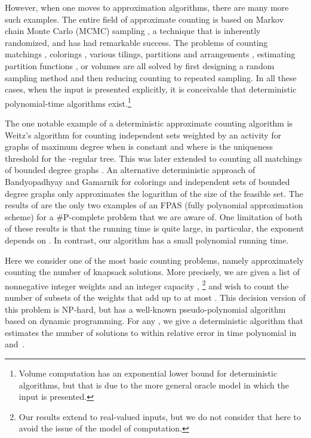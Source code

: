 \documentclass[11pt]{article}
\begin{document}
However, when one moves to approximation algorithms, there are
many more such examples. The entire field of approximate counting
is based on Markov chain Monte Carlo (MCMC) sampling
\cite{JerrumSinclair:survey}, a technique that is inherently
randomized, and has had remarkable success. The problems of
counting matchings
\cite{JerrumSinclair:matchings,JerrumSinclairVigoda}, colorings
\cite{Jerrum:colorings}, various tilings, partitions and
arrangements \cite{LubyRandallSinclair}, estimating partition
functions \cite{JerrumSinclair:Ising,StefankovicVempalaVigoda}, or
volumes \cite{DyerFriezeKannan,LovaszVempala} are all solved by
first designing a random sampling method and then reducing
counting to repeated sampling.
In all these cases, when
the input is presented explicitly, it is conceivable that
deterministic polynomial-time algorithms exist.\footnote{Volume
computation has an exponential lower bound for deterministic
algorithms, but that is due to the more general oracle model in
which the input is presented.}

The one notable example of a deterministic approximate counting
algorithm is Weitz's algorithm \cite{Weitz} for counting independent
sets weighted by an activity  for graphs of maximum degree 
when  is constant and
 where  is
the uniqueness threshold for the -regular tree.
This was later extended to counting all matchings of bounded degree
graphs \cite{BGKNT}.
An alternative deterministic approach of Bandyopadhyay and
Gamarnik \cite{BG} for colorings and independent sets of bounded degree
graphs only approximates the logarithm of the size of the feasible set.
The results of \cite{Weitz,BGKNT}
are the only two examples of an FPAS (fully polynomial approximation
scheme) for a \#P-complete problem that we are aware of.
One limitation of both of these results is that the running time is quite
large, in particular, the exponent depends on .
In contrast, our algorithm has a small polynomial running time.


Here we consider one of the most basic counting problems, namely
approximately counting the number of  knapsack solutions.
More precisely, we are given a list of nonnegative integer weights
 and an integer capacity ,
\footnote{Our results extend to real-valued inputs, but we do not
consider that here to avoid the issue of the model of computation.}
and wish to count the number of subsets of
the weights that add up to at most . This decision version of
this problem is NP-hard, but has a well-known pseudo-polynomial
algorithm based on dynamic programming. For any , we
give a deterministic algorithm that estimates the number of
solutions to within relative error  in time polynomial in
 and~.
\end{document}
